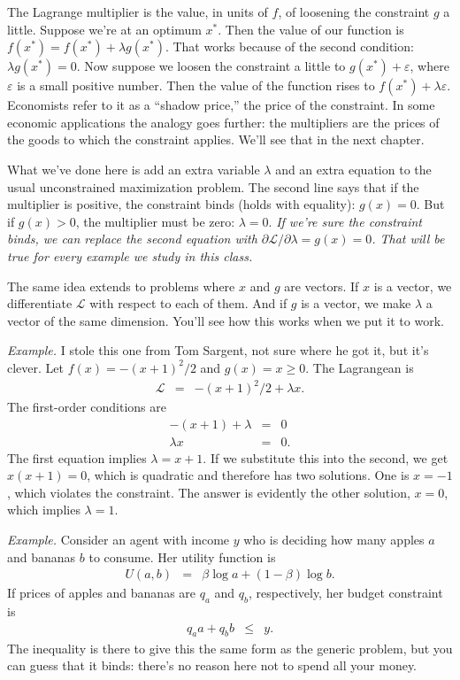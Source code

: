 \documentclass[11pt]{article}
\begin{document}
The Lagrange multiplier is the value, in units of $f$,
of loosening the constraint $g$ a little.
Suppose we're at an optimum $x^*$.
Then the value of our function is $f(x^*) = f(x^*) + \lambda g(x^*)$.
That works because of the second condition:  $\lambda g(x^*) = 0 $.
Now suppose we loosen the constraint a little to $g(x^*) + \varepsilon$,
where $\varepsilon$ is a small positive number.
Then the value of the function rises to $ f(x^*) + \lambda \varepsilon$.
Economists refer to it as a ``shadow price,''
the price of the constraint.
In some economic applications the analogy goes further:
the multipliers are the prices of the goods to which the constraint applies.
We'll see that in the next chapter.

What we've done here is add an extra variable $\lambda$
and an extra equation to the usual unconstrained maximization problem.
The second line says that if the multiplier is positive,
the constraint binds (holds with equality):  $g(x) = 0$.
But if $g(x) > 0$, the multiplier must be zero:  $\lambda = 0$.
{\it If we're sure the constraint binds, we can replace the second equation
with $ \partial \mathcal{L}/\partial \lambda = g(x) = 0$.
That will be true for every example we study in this class.\/}

The same idea extends to problems where $x$ and $g$
are vectors.
If $x$ is a vector, we differentiate $\mathcal{L}$ with
respect to each of them.
And if $g$ is a vector, we make $\lambda$ a vector of the same
dimension.
You'll see how this works when we put it to work.


{\it Example.\/}
I stole this one from Tom Sargent, not sure where he got it, but it's clever.
Let $f(x) =- (x+1)^2/2$  and $g(x) = x \geq 0$.
The Lagrangean is
\begin{eqnarray*}
    \mathcal{L} &=& - (x+1)^2/2 + \lambda x .
\end{eqnarray*}
The first-order conditions are
\begin{eqnarray*}
    -(x+1) + \lambda &=& 0 \\
    \lambda x &=& 0.
\end{eqnarray*}
The first equation implies $\lambda = x + 1$.
If we substitute this into the second, we get $x(x+1) = 0$,
which is quadratic and therefore has two solutions.
One is $x=-1$, which violates the constraint.
The answer is evidently the other solution, $x=0$, which implies $\lambda = 1$.


{\it Example.\/}
Consider an agent with income $y$ who is deciding
how many apples $a$ and bananas $b$ to consume.
Her utility function is
\begin{eqnarray*}
    U(a,b) &=& \beta \log a + (1-\beta) \log b .
\end{eqnarray*}
If prices of apples and bananas are $q_a$ and $q_b$,
respectively, her budget constraint is
\begin{eqnarray*}
    q_a a + q_b b  &\leq& y  .
\end{eqnarray*}
The inequality is there to give this the same form as the
generic problem, but you can guess that it binds:
there's no reason here not to spend all your money.
\end{document}
